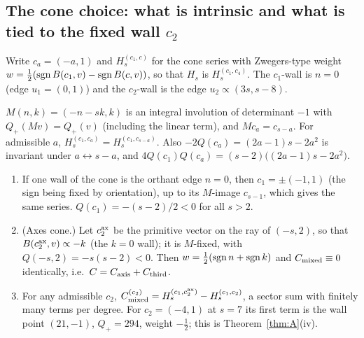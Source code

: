 \subsection{The cone choice: what is intrinsic and what is tied to the fixed wall $c_2$}\label{sec:conechoice}
Write $c_a=(-a,1)$ and $H_s^{(c_1,c)}$ for the cone series with Zwegers-type weight $w=\tfrac12(\operatorname{sgn} B(c_1,v)-\operatorname{sgn} B(c,v))$, so that $H_s$ is $H_s^{(c_1,c_4)}$. The $c_1$-wall is $n=0$ (edge $u_1=(0,1)$) and the $c_2$-wall is the edge $u_2\propto(3s,s-8)$.
\begin{proposition}\label{prop:Minv7}
$M(n,k)=(-n-sk,k)$ is an integral involution of determinant $-1$ with $Q_+(Mv)=Q_+(v)$ (including the linear term), and $Mc_a=c_{s-a}$. For admissible $a$, $H_s^{(c_1,c_a)}=H_s^{(c_1,c_{s-a})}$. Also $-2Q(c_a)=(2a-1)s-2a^2$ is invariant under $a\leftrightarrow s-a$, and $4Q(c_1)Q(c_a)=(s-2)\big((2a-1)s-2a^2\big)$.
\end{proposition}
\begin{proposition}\label{prop:axes7}
\begin{enumerate}[label=(\roman*)]
\item If one wall of the cone is the orthant edge $n=0$, then $c_1=\pm(-1,1)$ (the sign being fixed by orientation), up to its $M$-image $c_{s-1}$, which gives the same series. $Q(c_1)=-(s-2)/2<0$ for all $s>2$.
\item (Axes cone.) Let $c_2^{\rm ax}$ be the primitive vector on the ray of $(-s,2)$, so that $B(c_2^{\rm ax},v)\propto-k$ (the $k=0$ wall); it is $M$-fixed, with $Q(-s,2)=-s(s-2)<0$. Then $w=\tfrac12(\operatorname{sgn} n+\operatorname{sgn} k)$ and $C_{\mathrm{mixed}}\equiv0$ identically, i.e.\ $C=C_{\mathrm{axis}}+C_{\mathrm{third}}$.
\item For any admissible $c_2$, $C_{\mathrm{mixed}}^{(c_2)}=H_s^{(c_1,c_2^{\rm ax})}-H_s^{(c_1,c_2)}$, a sector sum with finitely many terms per degree. For $c_2=(-4,1)$ at $s=7$ its first term is the wall point $(21,-1)$, $Q_+=294$, weight $-\tfrac12$; this is Theorem~\ref{thm:A}(iv).
\end{enumerate}
\end{proposition}
